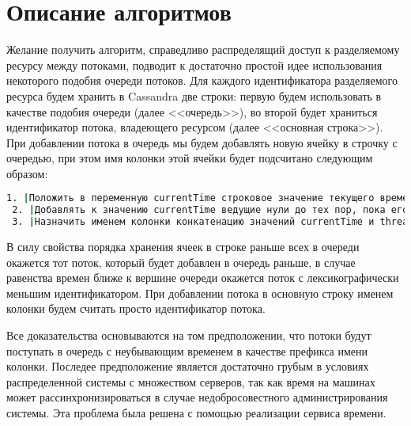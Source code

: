 \section{Описание алгоритмов}

Желание получить алгоритм, справедливо распределящий доступ к разделяемому ресурсу между потоками, подводит к достаточно простой идее использования некоторого подобия очереди потоков.
Для каждого идентификатора разделяемого ресурса будем хранить в Cassandra две строки: первую будем использовать в качестве подобия очереди (далее <<очередь>>), во второй будет храниться идентификатор потока, владеющего ресурсом (далее <<основная строка>>).
При добавлении потока в очередь мы будем добавлять новую ячейку в строчку с очередью, при этом имя колонки этой ячейки будет подсчитано следующим образом:

\begin{lstlisting}[language=csh,caption={Определение имени колонки для ячейки в очереди}]
 1. |Положить в переменную currentTime строковое значение текущего времени в микросекундах|
 2. |Добавлять к значению currentTime ведущие нули до тех пор, пока его длина не станет равной 20|
 3. |Назначить именем колонки конкатенацию значений currentTime и threadId|
\end{lstlisting}

В силу свойства порядка хранения ячеек в строке раньше всех в очереди окажется тот поток, который будет добавлен в очередь раньше, в случае равенства времен ближе к вершине очереди окажется поток с лексикографически меньшим идентификатором.
При добавлении потока в основную строку именем колонки будем считать просто идентификатор потока.

Все доказательства основываются на том предположении, что потоки будут поступать в очередь с неубывающим временем в качестве префикса имени колонки. Последее предположение является достаточно грубым в условиях распределенной системы с множеством серверов, так как время на машинах может рассинхронизироваться в случае недобросовестного администрирования системы. Эта проблема была решена с помощью реализации сервиса времени.









